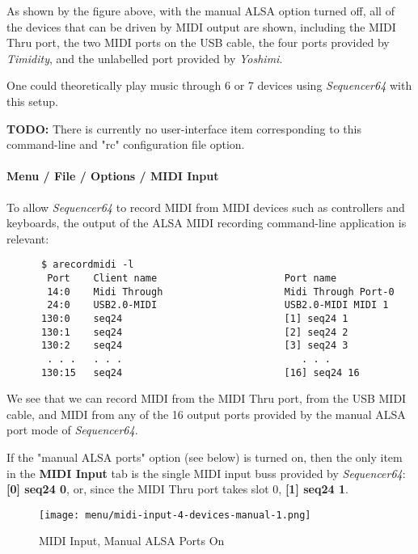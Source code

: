    As shown by the figure above, with the manual ALSA option turned off,
   all of the devices that can be driven by MIDI output are shown,
   including the MIDI Thru port, the two MIDI ports on the USB cable,
   the four ports provided by \textsl{Timidity}, and the unlabelled
   port provided by \textsl{Yoshimi}.

   One could theoretically play music through 6 or 7 devices using
   \textsl{Sequencer64} with this setup.

   \textbf{TODO:} 
   There is currently no user-interface item corresponding to this command-line
   and "rc" configuration file option.

\paragraph{Menu / File / Options / MIDI Input}
\label{paragraph:seq64_menu_file_options_midi_input}

   To allow \textsl{Sequencer64} to record MIDI from MIDI devices such as
   controllers and keyboards, the output of the ALSA MIDI recording
   command-line application is relevant:

   \begin{verbatim}
      $ arecordmidi -l
       Port    Client name                      Port name
       14:0    Midi Through                     Midi Through Port-0
       24:0    USB2.0-MIDI                      USB2.0-MIDI MIDI 1
      130:0    seq24                            [1] seq24 1
      130:1    seq24                            [2] seq24 2
      130:2    seq24                            [3] seq24 3
       . . .   . . .                               . . .
      130:15   seq24                            [16] seq24 16
   \end{verbatim}

   We see that we can record MIDI from the MIDI Thru port, from the USB MIDI
   cable, and MIDI from any of the 16 output ports provided by the manual ALSA
   port mode of \textsl{Sequencer64}.

   If the "manual ALSA ports" option (see below) is turned on,
   then the only item in the \textbf{MIDI Input} tab is the single MIDI input
   buss provided by \textsl{Sequencer64}:  \textbf{[0] seq24 0}, or, since
   the MIDI Thru port takes slot 0, \textbf{[1] seq24 1}.

\begin{figure}[H]
   \centering 
   \texttt{[image: menu/midi-input-4-devices-manual-1.png]}
   \caption{MIDI Input, Manual ALSA Ports On}
   \label{fig:seq64_midi_input_4_devices_manual_1}
\end{figure}

